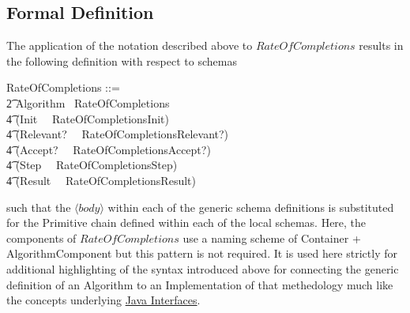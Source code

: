 \documentclass[../main.tex]{subfiles}
\begin{document}
\subsection{Formal Definition}
The application of the notation described above to $RateOfCompletions$ results
in the following definition with respect to schemas
\begin{zed}
  RateOfCompletions ::= \\
  \t2 Algorithm ~\comp RateOfCompletions ~\implies \\
  \t4 (Init ~\comp ~RateOfCompletionsInit) ~ \land \\
  \t4 (Relevant? ~\comp ~RateOfCompletionsRelevant?) ~\land \\
  \t4 (Accept? ~\comp ~RateOfCompletionsAccept?) ~\land \\
  \t4 (Step ~\comp ~RateOfCompletionsStep) ~\land \\
  \t4 (Result ~\comp ~RateOfCompletionsResult)
\end{zed}
such that the $\langle body \rangle$ within each of the generic schema definitions is substituted for
the Primitive chain defined within each of the local schemas. Here, the components of $RateOfCompletions$
use a naming scheme of Container + AlgorithmComponent but this pattern is not required. It is used here
strictly for additional highlighting of the syntax introduced above for connecting the generic
definition of an Algorithm to an Implementation of that methedology much like the concepts underlying
\href{https://docs.oracle.com/javase/tutorial/java/concepts/interface.html}{Java Interfaces}.
\end{document}
